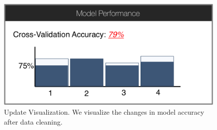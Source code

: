 \begin{figure}[t]
\centering
 \includegraphics[width=0.6\columnwidth]{figs/interface5.png}
 \caption{Update Visualization. We visualize the changes in model accuracy after data cleaning.}\label{modelacc}
\end{figure}